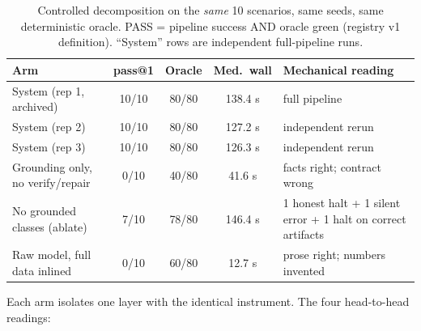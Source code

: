 \documentclass[11pt]{article}
\begin{document}
\begin{table}[h!t]\centering\small
\caption{Controlled decomposition on the \emph{same} 10 scenarios, same seeds, same
deterministic oracle. PASS = pipeline success AND oracle green (registry v1 definition).
``System'' rows are independent full-pipeline runs. \label{tab:registry-arms}}
\begin{tabular}{@{}lcccp{5.6cm}@{}}
\toprule
Arm & pass@1 & Oracle & Med.\ wall & Mechanical reading\\
\midrule
System (rep 1, archived) & 10/10 & 80/80 & 138.4 s & full pipeline\\
System (rep 2) & 10/10 & 80/80 & 127.2 s & independent rerun\\
System (rep 3) & 10/10 & 80/80 & 126.3 s & independent rerun\\
Grounding only, no verify/repair & 0/10 & 40/80 & 41.6 s & facts right; contract wrong\\
No grounded classes (ablate) & 7/10 & 78/80 & 146.4 s & 1 honest halt + 1 silent error + 1 halt on correct artifacts\\
Raw model, full data inlined & 0/10 & 60/80 & 12.7 s & prose right; numbers invented\\
\bottomrule
\end{tabular}
\end{table}

Each arm isolates one layer with the identical instrument. The four head-to-head readings:
\end{document}
